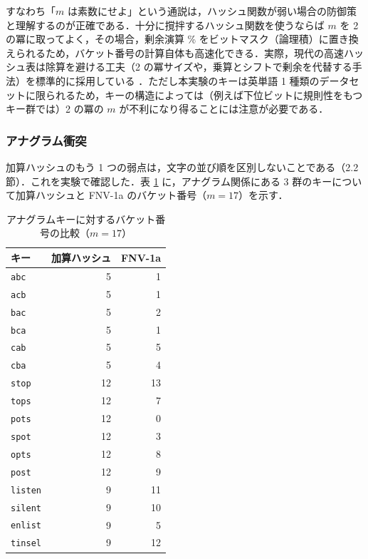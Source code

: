 すなわち「$m$ は素数にせよ」という通説は，ハッシュ関数が弱い場合の防御策と理解するのが正確である．十分に撹拌するハッシュ関数を使うならば $m$ を 2 の冪に取ってよく，その場合，剰余演算 \% をビットマスク（論理積）に置き換えられるため，バケット番号の計算自体も高速化できる．実際，現代の高速ハッシュ表は除算を避ける工夫（2 の冪サイズや，乗算とシフトで剰余を代替する手法）を標準的に採用している \cite{munoz2022std}．ただし本実験のキーは英単語 1 種類のデータセットに限られるため，キーの構造によっては（例えば下位ビットに規則性をもつキー群では）2 の冪の $m$ が不利になり得ることには注意が必要である．

\subsubsection{アナグラム衝突}

加算ハッシュのもう 1 つの弱点は，文字の並び順を区別しないことである（2.2 節）．これを実験で確認した．表 \ref{tab:anagram} に，アナグラム関係にある 3 群のキーについて加算ハッシュと FNV-1a のバケット番号（$m=17$）を示す．

\begin{table}[htbp]
\centering
\caption{アナグラムキーに対するバケット番号の比較（$m=17$）}
\label{tab:anagram}
\begin{tabular}{lrr}
\hline
キー & 加算ハッシュ & FNV-1a \\
\hline
{\tt abc}    & 5 & 1 \\
{\tt acb}    & 5 & 1 \\
{\tt bac}    & 5 & 2 \\
{\tt bca}    & 5 & 1 \\
{\tt cab}    & 5 & 5 \\
{\tt cba}    & 5 & 4 \\
\hline
{\tt stop}   & 12 & 13 \\
{\tt tops}   & 12 & 7 \\
{\tt pots}   & 12 & 0 \\
{\tt spot}   & 12 & 3 \\
{\tt opts}   & 12 & 8 \\
{\tt post}   & 12 & 9 \\
\hline
{\tt listen} & 9 & 11 \\
{\tt silent} & 9 & 10 \\
{\tt enlist} & 9 & 5 \\
{\tt tinsel} & 9 & 12 \\
\hline
\end{tabular}
\end{table}


